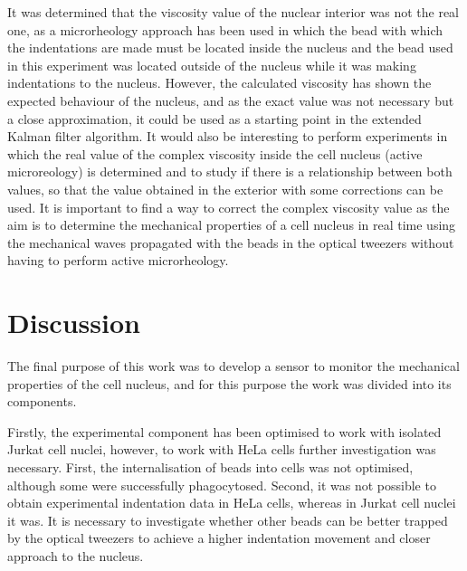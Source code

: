 \documentclass[12pt, a4paper]{article} %
\begin{document}
	\newpage
	
	It was determined that the viscosity value of the nuclear interior was not the real one, as a microrheology approach has been used in which the bead with which the indentations are made must be located inside the nucleus and the bead used in this experiment was located outside of the nucleus while it was making indentations to the nucleus. However, the calculated viscosity has shown the expected behaviour of the nucleus, and as the exact value was not necessary but a close approximation, it could be used as a starting point in the extended Kalman filter algorithm. It would also be interesting to perform experiments in which the real value of the complex viscosity inside the cell nucleus (active microreology) is determined and to study if there is a relationship between both values, so that the value obtained in the exterior with some corrections can be used. It is important to find a way to correct the complex viscosity value as the aim is to determine the mechanical properties of a cell nucleus in real time using the mechanical waves propagated with the beads in the optical tweezers without having to perform active microrheology.
	
	
	\newpage
	
	\setlength{\parskip}{0mm}
	
	
	\section{Discussion}
	
	The final purpose of this work was to develop a sensor to monitor the mechanical properties of the cell nucleus, and for this purpose the work was divided into its components. 
	
	\setlength{\parskip}{4mm}
	
	Firstly, the experimental component has been optimised to work with isolated Jurkat cell nuclei, however, to work with HeLa cells further investigation was necessary. First, the internalisation of beads into cells was not optimised, although some were successfully phagocytosed. Second, it was not possible to obtain experimental indentation data in HeLa cells, whereas in Jurkat cell nuclei it was. It is necessary to investigate whether other beads can be better trapped by the optical tweezers to achieve a higher indentation movement and closer approach to the nucleus.
	
\end{document}
